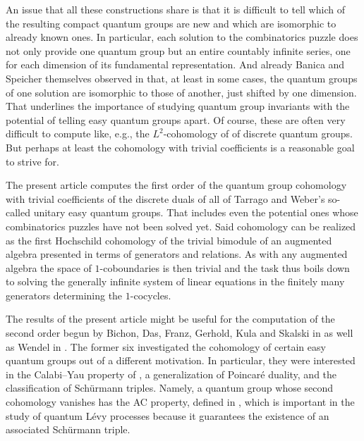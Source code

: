 \documentclass[pdftex]{sigma}
\numberwithin{equation}{section}
\begin{document}
An issue that all these constructions share is that it is difficult to tell which of the resulting compact quantum groups are new and which are isomorphic to already known ones. In particular, each solution to the combinatorics puzzle does not only provide one quantum group but an entire countably infinite series, one for each dimension of its fundamental representation. And already  Banica and Speicher themselves observed in \cite[Proposition~2.4\,(4)]{BanicaSpeicher2009} that, at least in some cases, the quantum groups of one solution are isomorphic to those of another, just shifted by one dimension. That underlines the importance of studying quantum group invariants with the potential of telling easy quantum groups apart. Of course, these are often very difficult to compute like, e.g., the $L^2$-cohomology of \cite{Kyed2008a} of discrete quantum groups. But perhaps at least the cohomology with trivial coefficients is a reasonable goal to strive for.

The present article computes the first order of the quantum group cohomology with trivial coefficients of the discrete duals of all of  Tarrago and Weber's so-called unitary easy quantum groups. That includes even the potential  ones whose combinatorics puzzles have not been solved yet. Said cohomology can be realized as the first Hochschild cohomology of the trivial bimodule of an augmented algebra presented in terms of generators and relations. As with any augmented algebra the space of $1$-coboundaries is then trivial and the task thus boils down to solving the generally infinite system of linear equations in the finitely many generators determining the $1$-cocycles.

The results of the present article might be useful for the computation of the second order begun by Bichon, Das, Franz, Gerhold, Kula and Skalski in \cite{BichonFranzGerhold2017, DasFranzKulaSkalski2018} as well as Wendel in \cite{Wendel2020}. The former six investigated the cohomology of certain easy quantum groups out of a different motivation. In particular, they were interested in the Calabi--Yau property of \cite{Ginzburg2006}, a generalization of  Poincar\'e duality, and the classification of Sch\"urmann triples. Namely, a quantum group whose second cohomology vanishes has the AC property, defined in \cite{FranzGerholdThom2015}, which is important in the study of quantum L\'evy processes because it guarantees the existence of an associated Sch\"urmann triple.
\end{document}
